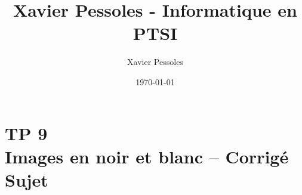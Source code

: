 \documentclass[
	fontsize=10pt, %
	twoside=true, %
]{kaobook}
\newcommand{\repRel}{../../../..}
\newcommand{\repStyle}{\repRel/Style}
\begin{document}

\titlehead{Xavier Pessoles - Informatique en PTSI}
\title[Xavier Pessoles - Informatique en PTSI]{Xavier Pessoles - Informatique en PTSI}
\author[XP]{Xavier Pessoles}
\date{\today}


\begingroup %
\endgroup

%
\mainmatter %
%
%
%
%


\setcounter{margintocdepth}{\sectiontocdepth}
\marginlayout
\graphicspath{{\repStyle/png}}

\pagestyle{xp.scrheadings}


%



\newcommand{\repExo}{}
\newcommand{\nomExo}{}

\livrettrue %
\livrettrue
\colletrue


\renewcommand{\repExo}{\repRel/Informatique/Exercices/S1_07_Images/}
\renewcommand{\nomExo}{04_ImageNB_2025}
\graphicspath{{\repStyle/png}{\repExo/04_ImageNB/images}}


\chapter*{TP 9 \\ 
Images en noir et blanc -- \ifprof Corrigé \else Sujet \fi}

\iflivret {} \else
\ifprof  {} \else \fi
\fi






%
% 
%
\end{document}
